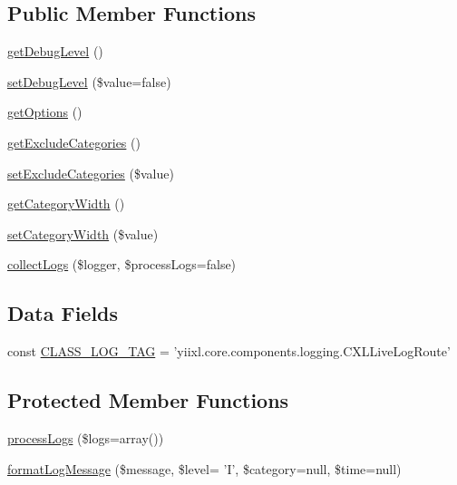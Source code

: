 \subsection*{Public Member Functions}
\begin{DoxyCompactItemize}
\item 
\hyperlink{classCXLLiveLogRoute_a122db96cedfc221cf187ce4328f992f7}{getDebugLevel} ()
\item 
\hyperlink{classCXLLiveLogRoute_a91ba7d911e2c3852a048f4022c45ec9e}{setDebugLevel} (\$value=false)
\item 
\hyperlink{classCXLLiveLogRoute_a1a49b8dded6e91a52e2fd07195d334da}{getOptions} ()
\item 
\hyperlink{classCXLLiveLogRoute_acc9683d3eaa74394ee82159398196ab8}{getExcludeCategories} ()
\item 
\hyperlink{classCXLLiveLogRoute_ad1fe56b8c471fa8818f46c39318f6373}{setExcludeCategories} (\$value)
\item 
\hyperlink{classCXLLiveLogRoute_af3edf920c9186a7479f274daaefb580b}{getCategoryWidth} ()
\item 
\hyperlink{classCXLLiveLogRoute_aca83de68fd6f754d3b9dcf265ff0be56}{setCategoryWidth} (\$value)
\item 
\hyperlink{classCXLLiveLogRoute_a6228d7e188b6c803663f67d4ea30aeda}{collectLogs} (\$logger, \$processLogs=false)
\end{DoxyCompactItemize}
\subsection*{Data Fields}
\begin{DoxyCompactItemize}
\item 
const \hyperlink{classCXLLiveLogRoute_aa607ab5e557e6ebb60b85c5a20ad067f}{CLASS\_\-LOG\_\-TAG} = 'yiixl.core.components.logging.CXLLiveLogRoute'
\end{DoxyCompactItemize}
\subsection*{Protected Member Functions}
\begin{DoxyCompactItemize}
\item 
\hyperlink{classCXLLiveLogRoute_a4ac809157dfd774390d8ea4b81223872}{processLogs} (\$logs=array())
\item 
\hyperlink{classCXLLiveLogRoute_ac9dde335d8302c5533f76115925722f9}{formatLogMessage} (\$message, \$level= 'I', \$category=null, \$time=null)
\end{DoxyCompactItemize}
